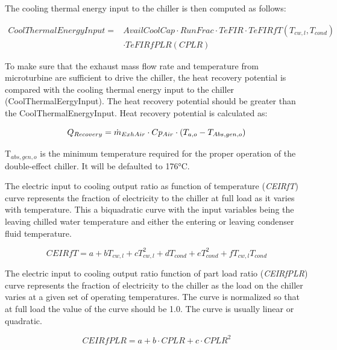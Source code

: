 The cooling thermal energy input to the chiller is then computed as follows:

\begin{equation}
\begin{split}
CoolThermalEnergyInput =& AvailCoolCap \cdot RunFrac \cdot TeFIR \cdot TeFIRfT\left( {{T_{cw,l}},{T_{cond}}} \right) \\
&\cdot TeFIRfPLR(CPLR)
\end{split}
\end{equation}

To make sure that the exhaust mass flow rate and temperature from microturbine are sufficient to drive the chiller, the heat recovery potential is compared with the cooling thermal energy input to the chiller (CoolThermalEergyInput). The heat recovery potential should be greater than the CoolThermalEnergyInput. Heat recovery potential is calculated as:

\begin{equation}
{Q_{Recovery}} = {\dot m_{ExhAir}} \cdot {\rm{}}C{p_{Air}} \cdot {\rm{}}({T_{a,o}} - {T_{Abs,gen,o}})
\end{equation}

T\(_{abs,gen,o}\) is the minimum temperature required for the proper operation of the double-effect chiller. It will be defaulted to 176°C.

The electric input to cooling output ratio as function of temperature (\emph{CEIRfT}) curve represents the fraction of electricity to the chiller at full load as it varies with temperature. This a biquadratic curve with the input variables being the leaving chilled water temperature and either the entering or leaving condenser fluid temperature.

\begin{equation}
CEIRfT = a + b{T_{cw,l}} + cT_{cw,l}^2 + d{T_{cond}} + eT_{cond}^2 + f{T_{cw,l}}{T_{cond}}
\end{equation}

The electric input to cooling output ratio function of part load ratio (\emph{CEIRfPLR}) curve represents the fraction of electricity to the chiller as the load on the chiller varies at a given set of operating temperatures. The curve is normalized so that at full load the value of the curve should be 1.0. The curve is usually linear or quadratic.

\begin{equation}
CEIRfPLR = a + b \cdot CPLR + c \cdot CPL{R^2}
\end{equation}

